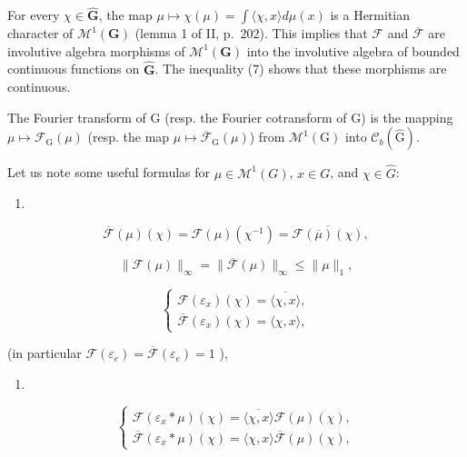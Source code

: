 For every \(\chi \in \widehat{\mathbf{G}}\), the map \(\mu \mapsto \chi(\mu) = \int \langle \chi, x \rangle d\mu(x)\) is a Hermitian character of \(\mathcal{M}^1(\mathbf{G})\) (lemma 1 of II, p.~202). This implies that \(\mathcal{F}\) and \(\overline{\mathcal{F}}\) are involutive algebra morphisms of \(\mathcal{M}^1(\mathbf{G})\) into the involutive algebra of bounded continuous functions on \(\widehat{\mathbf{G}}\). The inequality (7) shows that these morphisms are continuous.

The Fourier transform of G (resp. the Fourier cotransform of G) is the mapping \(\mu \mapsto \mathcal{F}_{\mathrm{G}}(\mu)\) (resp. the map \(\mu \mapsto \overline{\mathcal{F}}_{\mathrm{G}}(\mu)\)) from \(\mathcal{M}^1 (\mathrm{G})\) into \(\mathcal{C}_b(\widehat{\mathrm{G}})\).

Let us note some useful formulas for \(\mu\in\mathcal{M}^{1}(G)\), \(x\in G\), and \(\chi\in\widehat{G}\):

\begin{enumerate}
\def\labelenumi{(\arabic{enumi})}
\setcounter{enumi}{7}
\tightlist
\item
\end{enumerate}

\[
\overline {{\mathcal {F}}} (\mu) (\chi) = \mathcal {F} (\mu) (\chi^ {- 1}) = \overline {{\mathcal {F} (\overline {{\mu}}) (\chi)}},\tag{9}
\]

\[
\| \mathcal {F} (\mu) \| _ {\infty} = \| \overline {{\mathcal {F}}} (\mu) \| _ {\infty} \leqslant \| \mu \| _ {1},\tag{10}
\]

\[
\left\{ \begin{array}{l} \mathcal {F} (\varepsilon_ {x}) (\chi) = \overline {{\langle \chi , x \rangle}}, \\ \overline {{\mathcal {F}}} (\varepsilon_ {x}) (\chi) = \langle \chi , x \rangle , \end{array} \right.
\]

(in particular \(\mathcal{F}(\varepsilon_e) = \overline{\mathcal{F}} (\varepsilon_e) = 1\) ),

\begin{enumerate}
\def\labelenumi{(\arabic{enumi})}
\setcounter{enumi}{10}
\tightlist
\item
\end{enumerate}

\[
\left\{ \begin{array}{l} \mathcal {F} (\varepsilon_ {x} * \mu) (\chi) = \overline {{\langle \chi , x \rangle}} \mathcal {F} (\mu) (\chi), \\ \overline {{\mathcal {F}}} (\varepsilon_ {x} * \mu) (\chi) = \langle \chi , x \rangle \overline {{\mathcal {F}}} (\mu) (\chi), \end{array} \right.\tag{12}
\]

